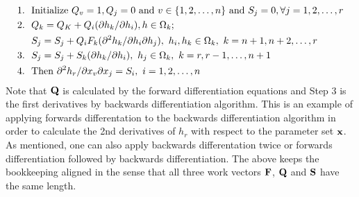 \begin{align*}
1.~~ & \hbox{Initialize } Q_v = 1, Q_j = 0 \hbox{ and } v\in \{1,2,\hdots, n\} \hbox{ and } S_j = 0, \forall j = 1,2, \hdots, r\\
2.~~ & Q_k = Q_K + Q_i (\partial h_k/ \partial h_i), h \in \Omega_k; \\
        & S_j = S_j + Q_i F_k (\partial^2 h_k/\partial h_i \partial h_j), ~ h_i, h_k \in \Omega_k, ~ k = n+1, n+2, \hdots, r\\ 
3.~~ & S_j = S_j + S_k (\partial h_k/\partial h_i), ~h_j \in \Omega_k,~ k = r, r-1, \hdots, n+1\\
4.~~ & \hbox{Then } \partial^2 h_r/\partial x_v \partial x_j = S_i, ~ i = 1,2,\hdots,n\\
\end{align*}Note that $\bf Q$ is calculated by the forward differentiation equations and Step 3 is the first derivatives by backwards differentiation algorithm. This is an example of applying forwards differentation to the backwards differentiation algorithm in order to calculate the 2nd derivatives of $h_r$ with respect to the parameter set $\bf x$. As mentioned, one can also apply backwards differentation twice or forwards differentiation followed by backwards differentiation. The above keeps the bookkeeping aligned in the sense that all three work vectors $\bf F$, $\bf Q$ and $\bf S$ have the same length.

